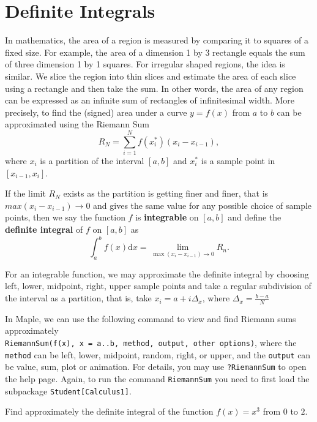 \documentclass[en,11pt,simple]{elegantbook}
\let\BeginKnitrBlock\begin \let\EndKnitrBlock\end
\begin{document}
\hypertarget{definite-integrals}{%
\section{Definite Integrals}\label{definite-integrals}}

In mathematics, the area of a region is measured by comparing it to squares of a fixed size. For example, the area of a dimension 1 by 3 rectangle equals the sum of three dimension 1 by 1 squares. For irregular shaped regions, the idea is similar. We slice the region into thin slices and estimate the area of each slice using a rectangle and then take the sum. In other words, the area of any region can be expressed as an infinite sum of rectangles of infinitesimal width. More precisely, to find the (signed) area under a curve \(y=f(x)\) from \(a\) to \(b\) can be approximated using the Riemann Sum
\[
R_N=\sum _{i=1}^{N}f(x_i^*)(x_i-x_{i-1}),
\]
where \(x_i\) is a partition of the interval \([a,b]\) and \(x_i^*\) is a sample point in \([x_{i-1}, x_i]\).

If the limit \(R_N\) exists as the partition is getting finer and finer, that is \(max(x_i-x_{i-1})\to 0\) and gives the same value for any possible choice of sample points, then we say the function \(f\) is \textbf{integrable} on \([a, b]\) and define the \textbf{definite integral} of \(f\) on \([a, b]\) as
\[
\int_a^bf(x)\mathrm{d} x= \lim\limits_{\max(x_i-x_{i-1})\to 0}R_n.
\]

For an integrable function, we may approximate the definite integral by choosing left, lower, midpoint, right, upper sample points and take a regular subdivision of the interval as a partition, that is, take \(x_i=a+i\Delta_x\), where \(\Delta_x=\frac{b-a}{N}\)

In Maple, we can use the following command to view and find Riemann sums approximately
\texttt{RiemannSum(f(x),\ x\ =\ a..b,\ method,\ output,\ other\ options)}, where the \texttt{method} can be left, lower, midpoint, random, right, or upper, and the \texttt{output} can be value, sum, plot or animation. For details, you may use \texttt{?RiemannSum} to open the help page.
Again, to run the command \texttt{RiemannSum} you need to first load the subpackage \texttt{Student{[}Calculus1{]}}.

\BeginKnitrBlock{example}{}{}
\protect\hypertarget{exm:unnamed-chunk-131}{}{\label{exm:unnamed-chunk-131} }
Find approximately the definite integral of the function \(f(x)=x^3\) from \(0\) to \(2\).
\EndKnitrBlock{example}
\end{document}

